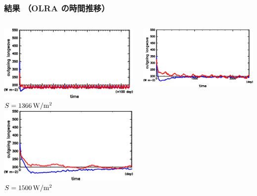 \documentclass[aspectratio=149,9pt,fleqn]{beamer}
\begin{document}
\begin{frame}
	\frametitle{結果 （OLRA の時間推移）}
	\begin{columns}[T]
		\begin{column}{.3\textwidth}
			\centering
			\includegraphics[width=\textwidth]{S1366/S1300_OLRA-OSRA_horimean_time0.0-14600.0-crop.png}
			\(S=1366\hmu{W/m^2}\)\\
			\includegraphics[width=\textwidth]{S1500/S1500_OLRA-OSRA_horimean_time0.0-1095.0-crop.png}
			\(S=1500\hmu{W/m^2}\)
		\end{column}
		\begin{column}{.3\textwidth}
			\centering
			\includegraphics[width=\textwidth]{S1600/S1600_OLRA-OSRA_horimean_time0.0-3650.0-crop.png}

\end{column}
\end{columns}
\end{frame}
\end{document}
